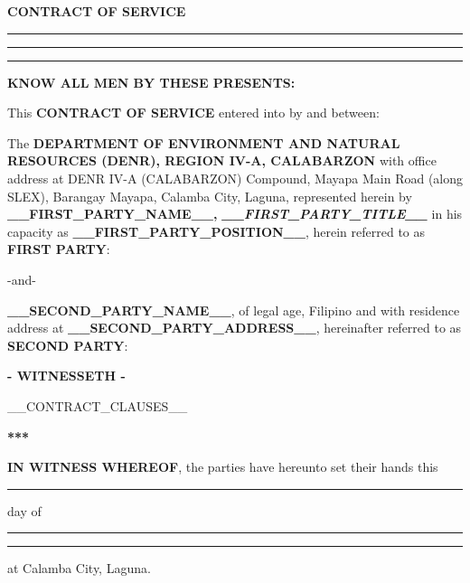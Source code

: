 \documentclass[11pt]{article}
\newcommand{\party}[1]{\textbf{\MakeUppercase{#1}}}
\begin{document}
\begin{center}
\textbf{CONTRACT OF SERVICE}

\rule{0.5in}{0.4pt}\quad\rule{0.5in}{0.4pt}\quad\rule{0.5in}{0.4pt}
\end{center}

\vspace{12pt}

\noindent
\textbf{KNOW ALL MEN BY THESE PRESENTS:}

This \textbf{CONTRACT OF SERVICE} entered into by and between:

The \textbf{DEPARTMENT OF ENVIRONMENT AND NATURAL RESOURCES (DENR), REGION IV-A, CALABARZON}
with office address at DENR IV-A (CALABARZON) Compound, Mayapa Main Road (along SLEX),
Barangay Mayapa, Calamba City, Laguna, represented herein by
\textbf{__FIRST_PARTY_NAME__, \textit{__FIRST_PARTY_TITLE__}}
in his capacity as \textbf{__FIRST_PARTY_POSITION__},
herein referred to as \party{FIRST PARTY}:

\vspace{-4pt}
\begin{center}
-and-
\end{center}
\vspace{-6pt}

\noindent
\hspace*{0.5in}
\textbf{__SECOND_PARTY_NAME__}, of legal age, Filipino and with residence address at
\textbf{__SECOND_PARTY_ADDRESS__},
hereinafter referred to as \party{SECOND PARTY}:

\vspace{6pt}

\begin{center}
\textbf{- WITNESSETH -}
\end{center}

\begingroup
{}
__CONTRACT_CLAUSES__
\endgroup

\par
\begin{center}
\textbf{***}
\end{center}

\newpage

\setlength{\parindent}{0pt}

\noindent
\textbf{IN WITNESS WHEREOF}, the parties have hereunto set their hands this
\rule{1in}{0.4pt} day of \rule{1.5in}{0.4pt} \rule{0.8in}{0.4pt}
at Calamba City, Laguna.
\end{document}
